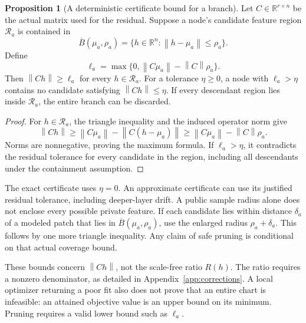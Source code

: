 \documentclass[11pt,a4paper]{article}
\theoremstyle{definition}
\newtheorem{proposition}[theorem]{Proposition}
\theoremstyle{definition}
\theoremstyle{remark}\newtheorem{remark}[theorem]{Remark}
\newcommand{\R}{\mathbb R}\newcommand{\Prob}{\mathbb P}\newcommand{\E}{\mathbb E}
\newcommand{\norm}[1]{\left\lVert #1\right\rVert}
\begin{document}
\begin{proposition}[A deterministic certificate bound for a branch]\label{prop:treeprune}
Let $C\in\R^{r\times n}$ be the actual matrix used for the residual. Suppose a node's candidate feature region $\mathcal R_a$ is contained in
\[
\overline B(\mu_a,\rho_a)=\{h\in\R^n:\norm{h-\mu_a}\le\rho_a\}.
\]
Define
\[
\ell_a=\max\{0,\norm{C\mu_a}-\norm C\rho_a\}.
\]
Then $\norm{Ch}\ge\ell_a$ for every $h\in\mathcal R_a$. For a tolerance $\eta\ge0$, a node with $\ell_a>\eta$ contains no candidate satisfying $\norm{Ch}\le\eta$. If every descendant region lies inside $\mathcal R_a$, the entire branch can be discarded.
\end{proposition}
\begin{proof}
For $h\in\mathcal R_a$, the triangle inequality and the induced operator norm give
\[
\norm{Ch}\ge\norm{C\mu_a}-\norm{C(h-\mu_a)}
\ge\norm{C\mu_a}-\norm C\rho_a.
\]
Norms are nonnegative, proving the maximum formula. If $\ell_a>\eta$, it contradicts the residual tolerance for every candidate in the region, including all descendants under the containment assumption.
\end{proof}

The exact certificate uses $\eta=0$. An approximate certificate can use its justified residual tolerance, including deeper-layer drift. A public sample radius alone does not enclose every possible private feature. If each candidate lies within distance $\delta_a$ of a modeled patch that lies in $\overline B(\mu_a,\rho_a)$, use the enlarged radius $\rho_a+\delta_a$. This follows by one more triangle inequality. Any claim of safe pruning is conditional on that actual coverage bound.

These bounds concern $\norm{Ch}$, not the scale-free ratio $R(h)$. The ratio requires a nonzero denominator, as detailed in Appendix~\ref{app:corrections}. A local optimizer returning a poor fit also does not prove that an entire chart is infeasible: an attained objective value is an upper bound on its minimum. Pruning requires a valid lower bound such as $\ell_a$.
\end{document}
